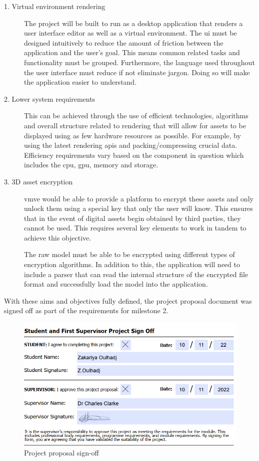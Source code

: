 \documentclass[11pt]{article}
\begin{document}
\begin{description}
  \item[1. Virtual environment rendering] 
    The project will be built to run as a desktop application that renders a user
    interface editor as well as a virtual environment. The \gls*{ui} must be
    designed intuitively to reduce the amount of friction between the application
    and the user's goal. This means common related tasks and functionality must be
    grouped. Furthermore, the language used throughout the user interface must
    reduce if not eliminate jargon. Doing so will make the application easier to
    understand.

  \item[2. Lower system requirements]
    This can be achieved through the use of efficient technologies, algorithms
    and overall structure related to rendering that will allow for assets to be
    displayed using as few hardware resources as possible. For example, by
    using the latest rendering \glspl*{api} and packing/compressing crucial
    data. Efficiency requirements vary based on the component in question which
    includes the \gls*{cpu}, \gls*{gpu}, memory and storage. 


  \item[3. 3D asset encryption]
    \gls*{vmve} would be able to provide a platform to encrypt these assets and
    only unlock them using a special key that only the user will know. This
    ensures that in the event of digital assets begin obtained by third parties,
    they cannot be used. This requires several key elements to work in tandem to
    achieve this objective.
    
    The raw model must be able to be encrypted using different types of
    encryption algorithms. In addition to this, the application will need to
    include a parser that can read the internal structure of the encrypted file
    format and successfully load the model into the application.
\end{description}


With these aims and objectives fully defined, the project proposal document was signed off
as part of the requirements for milestone 2. 
\begin{figure}[H]
  \centering
  \includegraphics[width=\textwidth]{images/project_signoff.png}
  \caption{Project proposal sign-off}
  \label{fig:project_signoff}
\end{figure}
\end{document}
